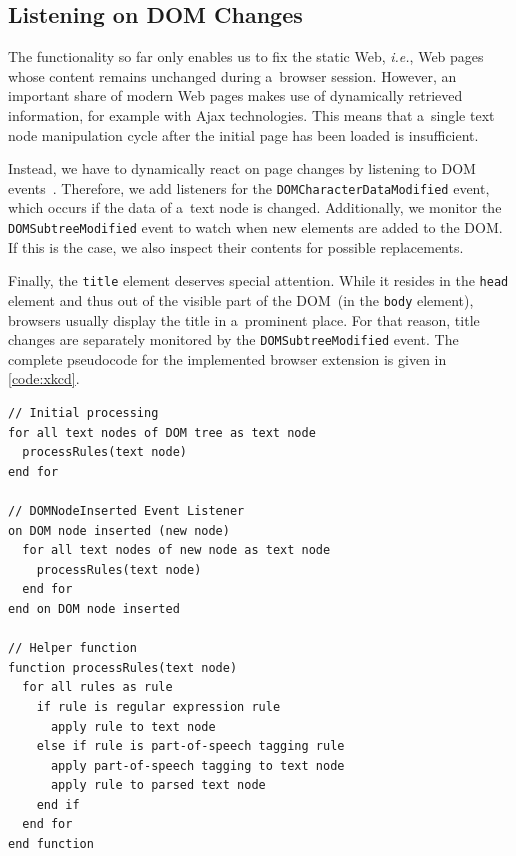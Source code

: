 \documentclass{sig-alternate}
\let\oldemph\emph
\renewcommand{\emph}[1]{\oldemph{\fontsize{9}{9}\selectfont #1}}
\begin{document}
\subsection{Listening on DOM Changes}
The functionality so far only enables us to fix the static Web, \emph{i.e.}, Web pages whose content remains unchanged during a~browser session.
However, an important share of modern Web pages makes use of dynamically retrieved information, for example with Ajax technologies.
This means that a~single text node manipulation cycle after the initial page has been loaded is insufficient.

Instead, we have to dynamically react on page changes by listening to DOM events~\cite{w3cevents2011}.
Therefore, we add listeners for the \Verb!DOMCharacterDataModified! event, which occurs if the data of a~text node is changed.
Additionally, we monitor the \Verb!DOMSubtreeModified! event to watch when new elements are added to the DOM.
If this is the case, we also inspect their contents for possible replacements.

Finally, the \Verb!title! element deserves special attention.
While it resides in the \Verb!head! element and thus out of the visible part of the DOM~(in the \Verb!body! element),
browsers usually display the title in a~prominent place.
For that reason, title changes are separately monitored by the \Verb!DOMSubtreeModified! event.
The complete pseudocode for the implemented browser extension is given in \autoref{code:xkcd}.

\begin{lstlisting}[caption=Pseudocode for the browser extension's logic., label=code:xkcd, float=h]
// Initial processing
for all text nodes of DOM tree as text node
  processRules(text node)
end for  

// DOMNodeInserted Event Listener
on DOM node inserted (new node)
  for all text nodes of new node as text node
    processRules(text node)
  end for  
end on DOM node inserted

// Helper function
function processRules(text node)
  for all rules as rule
    if rule is regular expression rule
      apply rule to text node
    else if rule is part-of-speech tagging rule
      apply part-of-speech tagging to text node
      apply rule to parsed text node
    end if
  end for
end function  
\end{lstlisting} 
\end{document}
